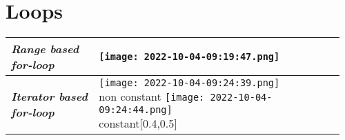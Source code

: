 \documentclass[main.tex,fontsize=8pt,paper=a4,paper=portrait,DIV=calc,]{scrartcl}
\begin{document}
\begin{table}[h!]
\section{Loops}
\begin{tabular}{|m{0.25\linewidth}|m{0.705\linewidth}|}
\hline
\textbf{\emph{Range based for-loop}}
& \texttt{[image: 2022-10-04-09:19:47.png]}\\
\hline
\textbf{\emph{Iterator based for-loop}}
& \minipg{\texttt{[image: 2022-10-04-09:24:39.png]}\newline non constant}
{\texttt{[image: 2022-10-04-09:24:44.png]}\newline constant}[0.4,0.5]\\
\hline
\end{tabular}
\end{table}
\pagebreak
\end{document}
